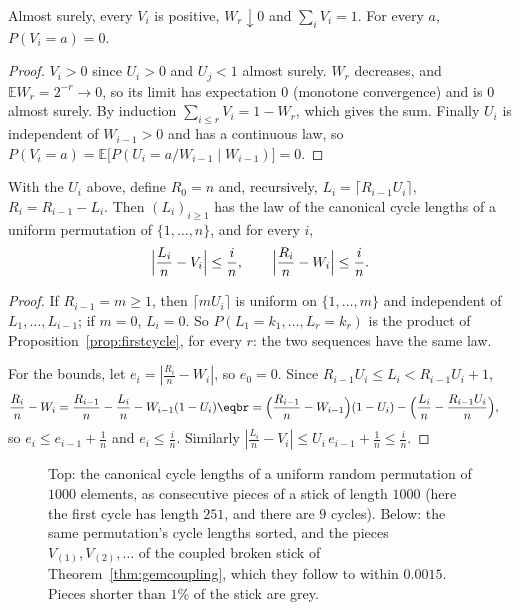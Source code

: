 \begin{lemma}\label{lem:gem}
Almost surely, every $V_i$ is positive, $W_r\downarrow0$ and $\sum_iV_i=1$. For every $a$, $P(V_i=a)=0$.
\end{lemma}
\begin{proof}
$V_i>0$ since $U_i>0$ and $U_j<1$ almost surely. $W_r$ decreases, and $\mathbb EW_r=2^{-r}\to0$, so its limit has expectation $0$ (monotone convergence) and is $0$ almost surely. By induction $\sum_{i\le r}V_i=1-W_r$, which gives the sum. Finally $U_i$ is independent of $W_{i-1}>0$
and has a continuous law, so $P(V_i=a)=\mathbb E\bigl[P(U_i=a/W_{i-1}\mid W_{i-1})\bigr]=0$.
\end{proof}

\begin{theorem}\label{thm:gemcoupling}
With the $U_i$ above, define $R_0=n$ and, recursively, $L_i=\lceil R_{i-1}U_i\rceil$, $R_i=R_{i-1}-L_i$. Then $(L_i)_{i\ge1}$ has the law of the canonical cycle lengths of a uniform permutation of $\{1,\dots,n\}$, and for every $i$,
\[
\Bigl|\frac{L_i}n-V_i\Bigr|\le\frac in,\qquad\Bigl|\frac{R_i}n-W_i\Bigr|\le\frac in.
\]
\end{theorem}
\begin{proof}
If $R_{i-1}=m\ge1$, then $\lceil mU_i\rceil$ is uniform on $\{1,\dots,m\}$ and independent of $L_1,\dots,L_{i-1}$; if $m=0$, $L_i=0$. So $P(L_1=k_1,\dots,L_r=k_r)$ is the product of Proposition~\ref{prop:firstcycle}, for every $r$: the two sequences have the same law.

For the bounds, let $e_i=|\frac{R_i}n-W_i|$, so $e_0=0$. Since $R_{i-1}U_i\le L_i<R_{i-1}U_i+1$,
\[
\begin{aligned}\frac{R_i}n-W_i&=\frac{R_{i-1}}n-\frac{L_i}n-W_{i-1}(1-U_i)\eqbr=\Bigl(\frac{R_{i-1}}n-W_{i-1}\Bigr)(1-U_i)-\Bigl(\frac{L_i}n-\frac{R_{i-1}U_i}n\Bigr),\end{aligned}
\]
so $e_i\le e_{i-1}+\frac1n$ and $e_i\le\frac in$. Similarly $|\frac{L_i}n-V_i|\le U_i\,e_{i-1}+\frac1n\le\frac in$.
\end{proof}

\begin{figure}[ht]
\centering{}
\caption{Top: the canonical cycle lengths of a uniform random permutation of $1000$ elements, as consecutive pieces of a stick of length $1000$ (here the first cycle has length $251$, and there are $9$ cycles). Below: the same permutation's cycle lengths sorted, and the
pieces $V_{(1)},V_{(2)},\dots$ of the coupled broken stick of Theorem~\ref{thm:gemcoupling}, which they follow to within $0.0015$. Pieces shorter than $1\%$ of the stick are grey.}
\label{fig:sticks}
\end{figure}

